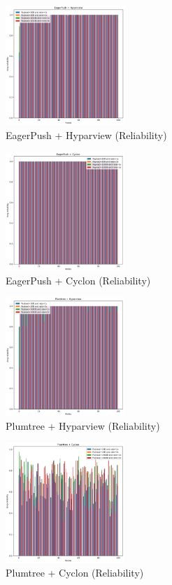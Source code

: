 \begin{figure}
  \includegraphics[width=0.4\textwidth]{images/EagerPush + HyparviewAvrg_Reliability.png}
  \caption{EagerPush + Hyparview (Reliability)}
\end{figure}

\begin{figure}
  \includegraphics[width=0.4\textwidth]{images/EagerPush + CyclonAvrg_Reliability.png}
  \caption{EagerPush + Cyclon (Reliability)}
\end{figure}

\begin{figure}
  \includegraphics[width=0.4\textwidth]{images/Plumtree + HyparviewAvrg_Reliability.png}
  \caption{Plumtree + Hyparview (Reliability)}
\end{figure}

\begin{figure}
  \includegraphics[width=0.4\textwidth]{images/Plumtree + CyclonAvrg_Reliability.png}
  \caption{Plumtree + Cyclon (Reliability)}
\end{figure}

